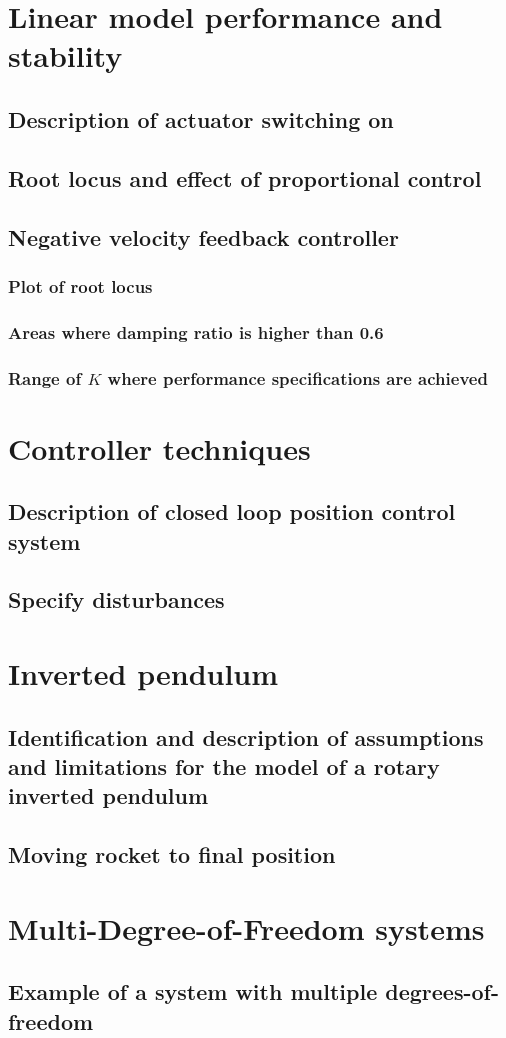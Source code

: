 \documentclass[11pt]{article}
\numberwithin{equation}{section}
\begin{document}
\section{Linear model performance and stability}
\subsection{Description of actuator switching on}
\subsection{Root locus and effect of proportional control}
\subsection{Negative velocity feedback controller}
\subsubsection{Plot of root locus}
\subsubsection{Areas where damping ratio is higher than 0.6}
\subsubsection{Range of $K$ where performance specifications are achieved}
\section{Controller techniques}
\subsection{Description of closed loop position control system}
\subsection{Specify disturbances}
\section{Inverted pendulum}
\subsection{Identification and description of assumptions and limitations for the model of a rotary inverted pendulum}
\subsection{Moving rocket to final position}
\section{Multi-Degree-of-Freedom systems}
\subsection{Example of a system with multiple degrees-of-freedom}
\end{document}

